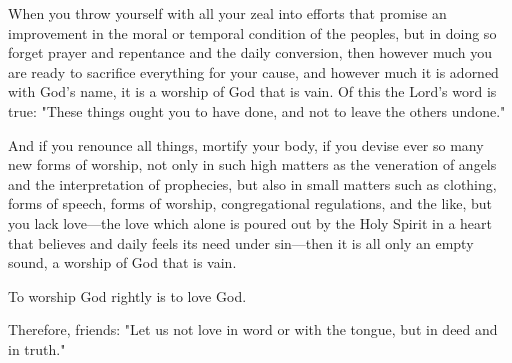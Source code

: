 When you throw yourself with all your zeal into efforts that promise an improvement in the moral or temporal condition of the peoples, but in doing so forget prayer and repentance and the daily conversion, then however much you are ready to sacrifice everything for your cause, and however much it is adorned with God's name, it is a worship of God that is vain. Of this the Lord's word is true: "These things ought you to have done, and not to leave the others undone."

And if you renounce all things, mortify your body, if you devise ever so many new forms of worship, not only in such high matters as the veneration of angels and the interpretation of prophecies, but also in small matters such as clothing, forms of speech, forms of worship, congregational regulations, and the like, but you lack love—the love which alone is poured out by the Holy Spirit in a heart that believes and daily feels its need under sin—then it is all only an empty sound, a worship of God that is vain.

To worship God rightly is to love God.

Therefore, friends: "Let us not love in word or with the tongue, but in deed and in truth."

